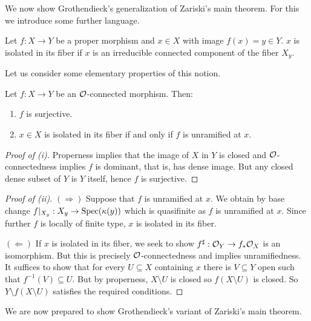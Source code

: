 We now show Grothendieck's generalization of Zariski's main theorem. For this we introduce some further language. 
\begin{definition}\label{def: isolated in fiber}
    Let $f:X\to Y$ be a proper morphism and $x\in X$ with image $f(x)=y\in Y$. $x$ is isolated in its fiber if $x$ is an irreducible connected component of the fiber $X_{y}$. 
\end{definition}
Let us consider some elementary properties of this notion. 
\begin{lemma}\label{lem: properties of O-connected morphisms}
    Let $f:X\to Y$ be an $\mathcal{O}$-connected morphism. Then:
    \begin{enumerate}[label=(\roman*)]
        \item $f$ is surjective. 
        \item $x\in X$ is isolated in its fiber if and only if $f$ is unramified at $x$. 
    \end{enumerate}
\end{lemma}
\begin{proof}[Proof of (i)]
    Properness implies that the image of $X$ in $Y$ is closed and $\mathcal{O}$-connectedness implies $f$ is dominant, that is, has dense image. But any closed dense subset of $Y$ is $Y$ itself, hence $f$ is surjective. 
\end{proof}
\begin{proof}[Proof of (ii)]
    $(\Rightarrow)$ Suppose that $f$ is unramified at $x$. We obtain by base change $f|_{X_{y}}:X_{y}\to\operatorname{Spec}(\kappa(y))$ which is quasifinite as $f$ is unramified at $x$. Since further $f$ is locally of finite type, $x$ is isolated in its fiber. 

    $(\Leftarrow)$ If $x$ is isolated in its fiber, we seek to show $f^{\sharp}:\mathcal{O}_{Y}\to f_{*}\mathcal{O}_{X}$ is an isomorphism. But this is precisely $\mathcal{O}$-connectedness and implies unramifiedness. It suffices to show that for every $U\subseteq X$ containing $x$ there is $V\subseteq Y$ open such that $f^{-1}(V)\subseteq U$. But by properness, $X\setminus U$ is closed so $f(X\setminus U)$ is closed. So $Y\setminus f(X\setminus U)$ satisfies the required conditions. 
\end{proof}
We are now prepared to show Grothendieck's variant of Zariski's main theorem. 

